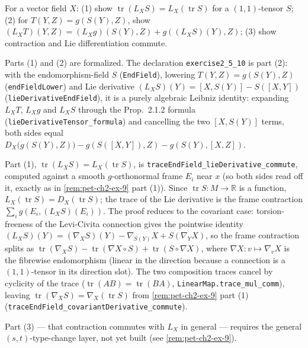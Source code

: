 \begin{remark}
  \label{rem:pet-ch2-ex-10}
  \leanok
  For a vector field $X$: (1) show $\operatorname{tr}(L_XS)=L_X(\operatorname{tr}S)$
  for a $(1,1)$-tensor $S$; (2) for $T(Y,Z)=g(S(Y),Z)$, show
  $(L_XT)(Y,Z)=(L_Xg)(S(Y),Z)+g((L_XS)(Y),Z)$; (3) show contraction and Lie
  differentiation commute.

  Parts (1) and (2) are formalized. The declaration \texttt{exercise2\_5\_10} is
  part (2): with the endomorphism-field $S$ (\texttt{EndField}), lowering
  $T(Y,Z)=g(S(Y),Z)$ (\texttt{endFieldLower}) and Lie derivative
  $(L_XS)(Y)=[X,S(Y)]-S([X,Y])$ (\texttt{lieDerivativeEndField}), it is a
  purely algebraic Leibniz identity: expanding $L_XT$, $L_Xg$ and $L_XS$ through
  the Prop.~2.1.2 formula (\texttt{lieDerivativeTensor\_formula}) and cancelling
  the two $[X,S(Y)]$ terms, both sides equal
  $D_X\big(g(S(Y),Z)\big)-g(S([X,Y]),Z)-g(S(Y),[X,Z])$.

  Part (1), $\operatorname{tr}(L_XS)=L_X(\operatorname{tr}S)$, is
  \texttt{traceEndField\_lieDerivative\_commute}, computed against a smooth
  $g$-orthonormal frame $E_i$ near $x$ (so both sides read off it, exactly as in
  \cref{rem:pet-ch2-ex-9} part (1)). Since $\operatorname{tr}S:M\to\mathbb R$ is a
  function, $L_X(\operatorname{tr}S)=D_X(\operatorname{tr}S)$; the trace of the Lie
  derivative is the frame contraction $\sum_i g(E_i,(L_XS)(E_i))$. The proof
  reduces to the covariant case: torsion-freeness of the Levi-Civita connection
  gives the pointwise identity
  $(L_XS)(Y)=(\nabla_XS)(Y)-\nabla_{S(Y)}X+S(\nabla_YX)$, so the frame contraction
  splits as $\operatorname{tr}(\nabla_XS)-\operatorname{tr}(\nabla X\circ S)
  +\operatorname{tr}(S\circ\nabla X)$, where $\nabla X:v\mapsto\nabla_vX$ is the
  fibrewise endomorphism (linear in the direction because a connection is a
  $(1,1)$-tensor in its direction slot). The two composition traces cancel by
  cyclicity of the trace ($\operatorname{tr}(AB)=\operatorname{tr}(BA)$,
  \texttt{LinearMap.trace\_mul\_comm}), leaving
  $\operatorname{tr}(\nabla_XS)=\nabla_X(\operatorname{tr}S)$ from
  \cref{rem:pet-ch2-ex-9} part (1) (\texttt{traceEndField\_covariantDerivative\_commute}).

  Part (3) — that contraction commutes with $L_X$ in general — requires the general
  $(s,t)$-type-change layer, not yet built (see \cref{rem:pet-ch2-ex-9}).
\end{remark}

